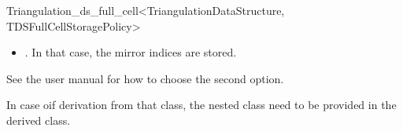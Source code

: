 \begin{ccRefClass}{Triangulation_ds_full_cell<TriangulationDataStructure, TDSFullCellStoragePolicy>}
\begin{itemize}
\item {}. In that case, the mirror
indices are stored.
\end{itemize}
See the user manual for how to choose the second option.

\ccIsModel


\begin{ccAdvanced}
In case oif derivation from that class, the nested class
 need to be provided in  the derived class.
\end{ccAdvanced}


\ccSeeAlso

\\

\end{ccRefClass}
